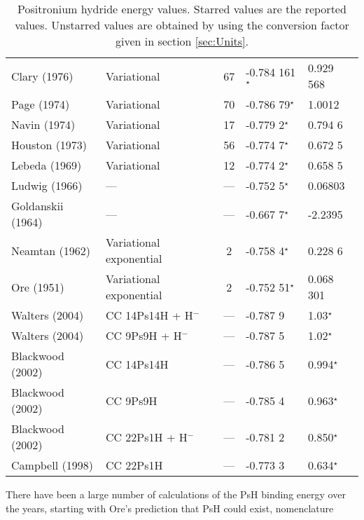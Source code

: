 \documentclass[Dissertation.tex]{subfiles}
\begin{document}
\begin{table}[H]
\begin{center}
\begin{tabular}{l l c l l}
Clary (1976) \cite{Clary1976} & Variational & 67 & -0.784 161$^\star$ & 0.929 568 \\
Page (1974) \cite{Page1974} & Variational & 70 & -0.786 79$^\star$ & 1.0012 \\
Navin (1974) \cite{Navin1974} & Variational & 17 & -0.779 2$^\star$ & 0.794 6 \\
Houston (1973) \cite{Houston1973} & Variational & 56 & -0.774 7$^\star$ & 0.672 5 \\
Lebeda (1969) \cite{Lebeda1969} & Variational & 12 & -0.774 2$^\star$ & 0.658 5 \\
Ludwig (1966) \cite{Ludwig1966} & --- & --- & -0.752 5$^\star$ & 0.06803 \\
Goldanskii (1964) \cite{Clary1976} & --- & --- & -0.667 7$^\star$ & -2.2395 \\
Neamtan (1962) \cite{Neamtan1962} & Variational exponential & 2 & -0.758 4$^\star$ & 0.228 6 \\
Ore (1951) \cite{Ore1951} & Variational exponential & 2 & -0.752 51$^\star$ & 0.068 301 \\
\midrule
Walters (2004) \cite{Walters2004} & CC 14Ps14H + H$^-$ & --- & -0.787 9 & 1.03$^\star$\\
Walters (2004) \cite{Walters2004} & CC 9Ps9H + H$^-$ & --- & -0.787 5 & 1.02$^\star$\\
Blackwood (2002) \cite{Blackwood2002} & CC 14Ps14H & --- & -0.786 5  & 0.994$^\star$ \\
Blackwood (2002) \cite{Blackwood2002} & CC 9Ps9H & --- & -0.785 4 & 0.963$^\star$ \\
Blackwood (2002) \cite{Blackwood2002b} & CC 22Ps1H + H$^-$ & --- & -0.781 2 & 0.850$^\star$ \\
Campbell (1998) \cite{Campbell1998} & CC 22Ps1H & --- & -0.773 3 & 0.634$^\star$ \\
\bottomrule
\end{tabular}
\caption[Positronium hydride energy values]{Positronium hydride energy values. Starred values are the reported values. Unstarred values are obtained by using the conversion factor given in section \ref{sec:Units}.}
\label{tab:BoundEnergyOther}
\end{center}
\end{table}

There have been a large number of calculations of the PsH binding energy over the years, starting with Ore's prediction that PsH could exist,  \cite{Ore1951}
nomenclature
\end{document}
